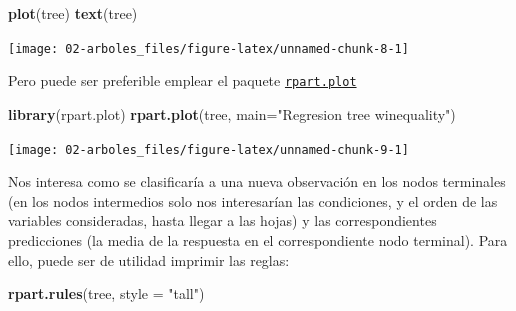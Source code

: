 \documentclass[]{book}
\newenvironment{Shaded}{\begin{snugshade}}{\end{snugshade}}
\newcommand{\KeywordTok}[1]{\textcolor[rgb]{0.13,0.29,0.53}{\textbf{#1}}}
\newcommand{\DataTypeTok}[1]{\textcolor[rgb]{0.13,0.29,0.53}{#1}}
\newcommand{\StringTok}[1]{\textcolor[rgb]{0.31,0.60,0.02}{#1}}
\newcommand{\NormalTok}[1]{#1}
\theoremstyle{break}
\theoremstyle{definition}
\theoremstyle{definition}
\theoremstyle{definition}
\theoremstyle{remark}
\begin{document}
\begin{Shaded}
\begin{Highlighting}[]
\KeywordTok{plot}\NormalTok{(tree)}
\KeywordTok{text}\NormalTok{(tree)}
\end{Highlighting}
\end{Shaded}

\begin{center}\texttt{[image: 02-arboles\_files/figure-latex/unnamed-chunk-8-1]} \end{center}

Pero puede ser preferible emplear el paquete
\href{https://CRAN.R-project.org/package=rpart.plot}{\texttt{rpart.plot}}

\begin{Shaded}
\begin{Highlighting}[]
\KeywordTok{library}\NormalTok{(rpart.plot)}
\KeywordTok{rpart.plot}\NormalTok{(tree, }\DataTypeTok{main=}\StringTok{"Regresion tree winequality"}\NormalTok{)  }
\end{Highlighting}
\end{Shaded}

\begin{center}\texttt{[image: 02-arboles\_files/figure-latex/unnamed-chunk-9-1]} \end{center}

Nos interesa como se clasificaría a una nueva observación en los nodos
terminales (en los nodos intermedios solo nos interesarían las
condiciones, y el orden de las variables consideradas, hasta llegar a
las hojas) y las correspondientes predicciones (la media de la respuesta
en el correspondiente nodo terminal). Para ello, puede ser de utilidad
imprimir las reglas:

\begin{Shaded}
\begin{Highlighting}[]
\KeywordTok{rpart.rules}\NormalTok{(tree, }\DataTypeTok{style =} \StringTok{"tall"}\NormalTok{)}
\end{Highlighting}
\end{Shaded}
\end{document}
